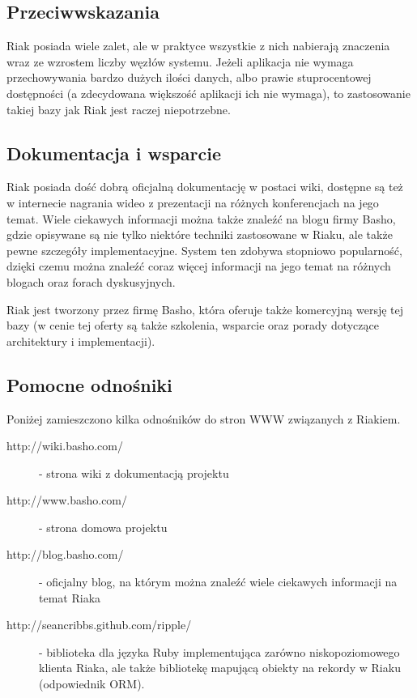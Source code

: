 \subsection*{Przeciwwskazania}

Riak posiada wiele zalet, ale w praktyce wszystkie z nich nabierają znaczenia wraz ze wzrostem liczby węzłów systemu.
Jeżeli aplikacja nie wymaga przechowywania bardzo dużych ilości danych, albo prawie stuprocentowej dostępności (a zdecydowana większość aplikacji ich nie wymaga), to zastosowanie takiej bazy jak Riak jest raczej niepotrzebne.

\subsection*{Dokumentacja i wsparcie}

Riak posiada dość dobrą oficjalną dokumentację w postaci wiki, dostępne są też w internecie nagrania wideo z prezentacji na różnych konferencjach na jego temat.
Wiele ciekawych informacji można także znaleźć na blogu firmy Basho, gdzie opisywane są nie tylko niektóre techniki zastosowane w Riaku, ale także pewne szczegóły implementacyjne.
System ten zdobywa stopniowo popularność, dzięki czemu można znaleźć coraz więcej informacji na jego temat na różnych blogach oraz forach dyskusyjnych.

Riak jest tworzony przez firmę Basho, która oferuje także komercyjną wersję tej bazy (w cenie tej oferty są także szkolenia, wsparcie oraz porady dotyczące architektury i implementacji).

\subsection*{Pomocne odnośniki}
 
Poniżej zamieszczono kilka odnośników do stron WWW związanych z Riakiem.

\begin{description}
 \item [http://wiki.basho.com/] - strona wiki z dokumentacją projektu
 \item [http://www.basho.com/] - strona domowa projektu
 \item [http://blog.basho.com/] - oficjalny blog, na którym można znaleźć wiele ciekawych informacji na temat Riaka
 \item [http://seancribbs.github.com/ripple/] - biblioteka dla języka Ruby implementująca zarówno niskopoziomowego klienta Riaka, ale także bibliotekę mapującą obiekty na rekordy w Riaku (odpowiednik ORM).
\end{description}
